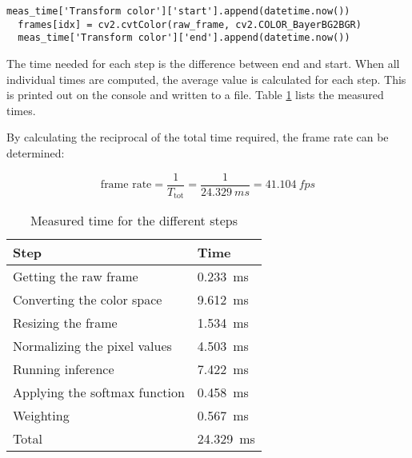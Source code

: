 \begin{lstlisting}[style=python, caption={Measuring the required time for the color space conversion}, label=lst:measure_time]
  meas_time['Transform color']['start'].append(datetime.now())
  frames[idx] = cv2.cvtColor(raw_frame, cv2.COLOR_BayerBG2BGR)
  meas_time['Transform color']['end'].append(datetime.now())
\end{lstlisting}

The time needed for each step is the difference between end and start.
When all individual times are computed, the average value is calculated for each step.
This is printed out on the console and written to a file.
Table \ref{tab:measured_times} lists the measured times.

By calculating the reciprocal of the total time required, the frame rate can be determined:

\begin{equation}
  \text{frame rate} = \frac{1}{T_{\text{tot}}} = \frac{1}{\SI{24.329}{ms}} = \SI{41.104}{fps}
  \label{eq:achieved_framerate}
\end{equation}

\begin{table}
  \caption{Measured time for the different steps}
  \label{tab:measured_times}
  \centering
  \begin{tabular}{ll}
    \toprule
    \textbf{Step} & \textbf{Time} \\
    \midrule
    Getting the raw frame & \SI{0.233}{ms} \\
    Converting the color space & \SI{9.612}{ms} \\
    Resizing the frame & \SI{1.534}{ms} \\
    Normalizing the pixel values & \SI{4.503}{ms} \\
    Running inference & \SI{7.422}{ms} \\
    Applying the softmax function & \SI{0.458}{ms} \\
    Weighting & \SI{0.567}{ms} \\
    \midrule
    Total & \SI{24.329}{ms} \\
    \bottomrule
  \end{tabular}
\end{table}
